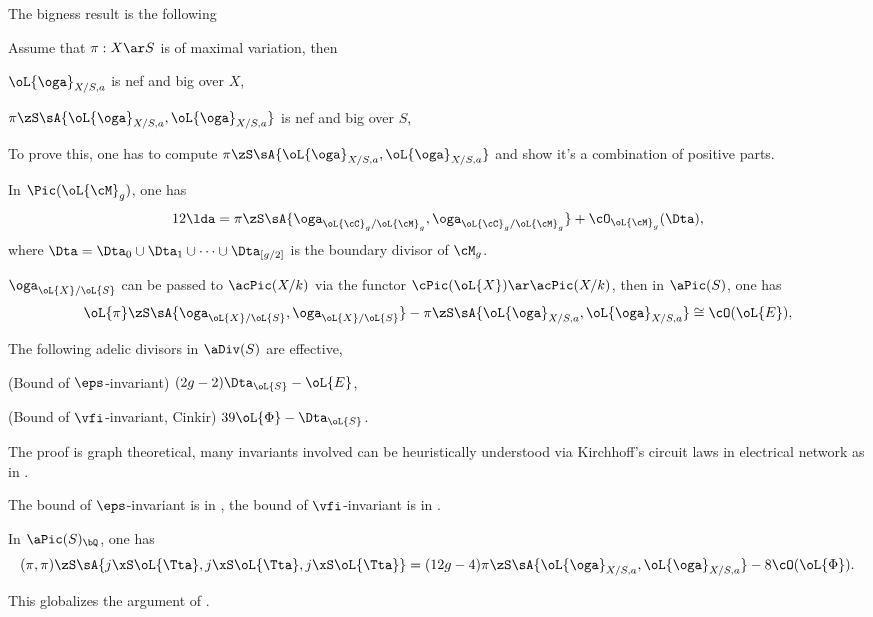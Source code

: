 \documentclass[a4paper, twoside]{article}
\begin{document}
The bigness result is the following
\begin{thm}
	Assume that $\pi:X\ar S$ is of maximal variation, then
	\begin{enr}
		\item $\oL{\oga}_{X/S,a}$ is nef and big over $X$,
		\item $\pi\zS\sA{\oL{\oga}_{X/S,a},\oL{\oga}_{X/S,a}}$ is nef and big over $S$,
	\end{enr}
\end{thm}


To prove this, one has to compute $\pi\zS\sA{\oL{\oga}_{X/S,a},\oL{\oga}_{X/S,a}}$ and show it's a combination of positive parts.

\begin{enr}
	\item {}
	\begin{thm}
		In $\Pic(\oL{\cM}_{g})$, one has
		\[
			12\lda=\pi\zS\sA{\oga_{\oL{\cC}_{g}/\oL{\cM}_{g}},\oga_{\oL{\cC}_{g}/\oL{\cM}_{g}}}+\cO_{\oL{\cM}_{g}}(\Dta),
		\]
		where $\Dta=\Dta_{0}\cup\Dta_{1}\cup\cdots\cup\Dta_{[g/2]}$ is the boundary divisor of $\cM_{g}$.
	\end{thm}
	\item {}
	\begin{thm}
		$\oga_{\oL{X}/\oL{S}}$ can be passed to $\acPic(X/k)$ via the functor $\cPic(\oL{X})\ar\acPic(X/k)$, then in $\aPic(S)$, one has
		\[
			\oL{\pi}\zS\sA{\oga_{\oL{X}/\oL{S}},\oga_{\oL{X}/\oL{S}}}-\pi\zS\sA{\oL{\oga}_{X/S,a},\oL{\oga}_{X/S,a}}\cong\cO(\oL{E}),
		\]
	\end{thm}
	\item {}
	\begin{lem}
		The following adelic divisors in $\aDiv(S)$ are effective,
		\begin{enr}
			\item (Bound of $\eps$-invariant) $(2g-2)\Dta_{\oL{S}}-\oL{E}$,
			\item (Bound of $\vfi$-invariant, Cinkir) $39\oL{\Phi}-\Dta_{\oL{S}}$.
		\end{enr}
	\end{lem}

	\begin{rmk}
		The proof is graph theoretical, many invariants involved can be heuristically understood via Kirchhoff's circuit laws in electrical network as in \cite{BF2006Graph}.

		The bound of $\eps$-invariant is in \cite{BF2006Graph}, the bound of $\vfi$-invariant is in \cite[Theorem~2.11]{Cinkir2011}.
	\end{rmk}
	\item {}
	\begin{thm}
		In $\aPic(S)_{\bQ}$, one has
		\[
			(\pi,\pi)\zS\sA{j\xS\oL{\Tta},j\xS\oL{\Tta},j\xS\oL{\Tta}}=(12g-4)\pi\zS\sA{\oL{\oga}_{X/S,a},\oL{\oga}_{X/S,a}}-8\cO(\oL{\Phi}).
		\]
	\end{thm}
	\begin{rmk}
		This globalizes the argument of \cite[Theorem~8.1]{deJong2018}.
	\end{rmk}
\end{enr}
\end{document}
